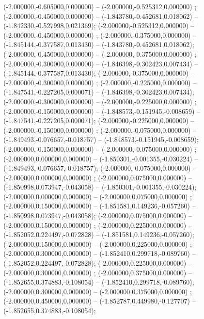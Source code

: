  (-2.000000,-0.605000,0.000000) -- (-2.000000,-0.525312,0.000000) ;
 (-2.000000,-0.450000,0.000000) -- (-1.843780,-0.452681,0.018062) -- (-1.842330,-0.527998,0.021369);
 (-2.000000,-0.525312,0.000000) -- (-2.000000,-0.450000,0.000000) ;
 (-2.000000,-0.375000,0.000000) -- (-1.845144,-0.377587,0.013430) -- (-1.843780,-0.452681,0.018062);
 (-2.000000,-0.450000,0.000000) -- (-2.000000,-0.375000,0.000000) ;
 (-2.000000,-0.300000,0.000000) -- (-1.846398,-0.302423,0.007434) -- (-1.845144,-0.377587,0.013430);
 (-2.000000,-0.375000,0.000000) -- (-2.000000,-0.300000,0.000000) ;
 (-2.000000,-0.225000,0.000000) -- (-1.847541,-0.227205,0.000071) -- (-1.846398,-0.302423,0.007434);
 (-2.000000,-0.300000,0.000000) -- (-2.000000,-0.225000,0.000000) ;
 (-2.000000,-0.150000,0.000000) -- (-1.848573,-0.151945,-0.008659) -- (-1.847541,-0.227205,0.000071);
 (-2.000000,-0.225000,0.000000) -- (-2.000000,-0.150000,0.000000) ;
 (-2.000000,-0.075000,0.000000) -- (-1.849493,-0.076657,-0.018757) -- (-1.848573,-0.151945,-0.008659);
 (-2.000000,-0.150000,0.000000) -- (-2.000000,-0.075000,0.000000) ;
 (-2.000000,0.000000,0.000000) -- (-1.850301,-0.001355,-0.030224) -- (-1.849493,-0.076657,-0.018757);
 (-2.000000,-0.075000,0.000000) -- (-2.000000,0.000000,0.000000) ;
 (-2.000000,0.075000,0.000000) -- (-1.850998,0.073947,-0.043058) -- (-1.850301,-0.001355,-0.030224);
 (-2.000000,0.000000,0.000000) -- (-2.000000,0.075000,0.000000) ;
 (-2.000000,0.150000,0.000000) -- (-1.851581,0.149236,-0.057260) -- (-1.850998,0.073947,-0.043058);
 (-2.000000,0.075000,0.000000) -- (-2.000000,0.150000,0.000000) ;
 (-2.000000,0.225000,0.000000) -- (-1.852052,0.224497,-0.072828) -- (-1.851581,0.149236,-0.057260);
 (-2.000000,0.150000,0.000000) -- (-2.000000,0.225000,0.000000) ;
 (-2.000000,0.300000,0.000000) -- (-1.852410,0.299718,-0.089760) -- (-1.852052,0.224497,-0.072828);
 (-2.000000,0.225000,0.000000) -- (-2.000000,0.300000,0.000000) ;
 (-2.000000,0.375000,0.000000) -- (-1.852655,0.374883,-0.108054) -- (-1.852410,0.299718,-0.089760);
 (-2.000000,0.300000,0.000000) -- (-2.000000,0.375000,0.000000) ;
 (-2.000000,0.450000,0.000000) -- (-1.852787,0.449980,-0.127707) -- (-1.852655,0.374883,-0.108054);

